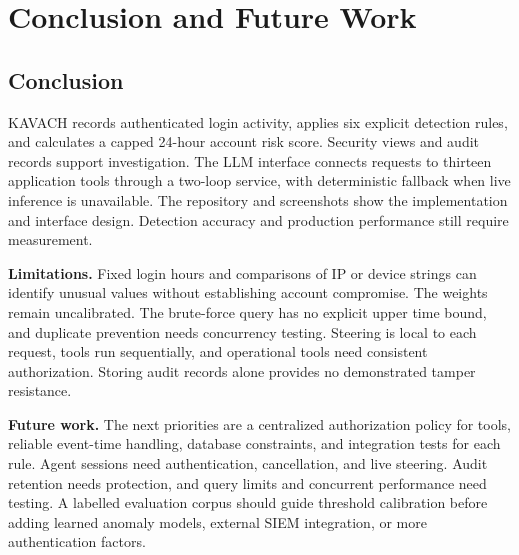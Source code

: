 \chapter{Conclusion and Future Work}
\section{Conclusion}
KAVACH records authenticated login activity, applies six explicit detection rules, and calculates a capped 24-hour account risk score. Security views and audit records support investigation. The LLM interface connects requests to thirteen application tools through a two-loop service, with deterministic fallback when live inference is unavailable. The repository and screenshots show the implementation and interface design. Detection accuracy and production performance still require measurement.

\noindent\textbf{Limitations.}
Fixed login hours and comparisons of IP or device strings can identify unusual values without establishing account compromise. The weights remain uncalibrated. The brute-force query has no explicit upper time bound, and duplicate prevention needs concurrency testing. Steering is local to each request, tools run sequentially, and operational tools need consistent authorization. Storing audit records alone provides no demonstrated tamper resistance.

\noindent\textbf{Future work.}
The next priorities are a centralized authorization policy for tools, reliable event-time handling, database constraints, and integration tests for each rule. Agent sessions need authentication, cancellation, and live steering. Audit retention needs protection, and query limits and concurrent performance need testing. A labelled evaluation corpus should guide threshold calibration before adding learned anomaly models, external SIEM integration, or more authentication factors.

